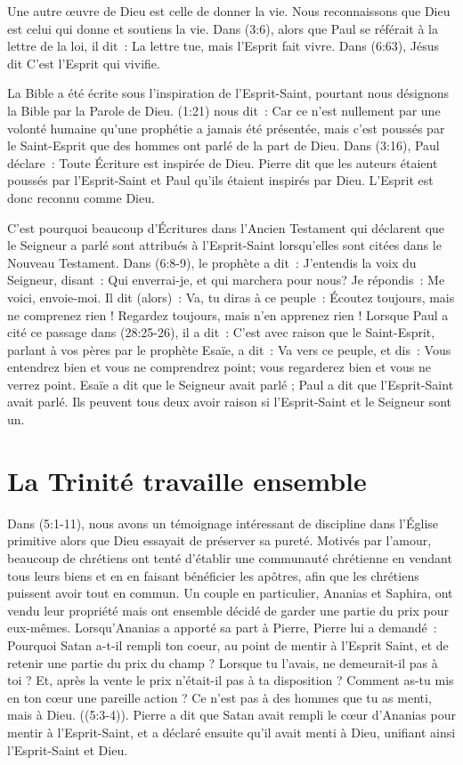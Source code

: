 Une autre œuvre de Dieu est celle de donner la vie. Nous reconnaissons que Dieu est celui qui donne et soutiens la vie. Dans (3:6), alors que Paul se référait à la lettre de la loi, il dit~: \og La lettre tue, mais l'Esprit fait vivre. \fg{} Dans (6:63), Jésus dit \og C'est l'Esprit qui vivifie.\fg{}

La Bible a été écrite sous l'inspiration de l'Esprit-Saint, pourtant nous désignons la Bible par la Parole de Dieu. (1:21) nous dit~: \og Car ce n'est nullement par une volonté humaine qu'une prophétie a jamais été présentée, mais c'est poussés par le Saint-Esprit que des hommes ont parlé de la part de Dieu. \fg{} Dans (3:16), Paul déclare~: \og Toute Écriture est inspirée de Dieu. \fg{} Pierre dit que les auteurs étaient poussés par l'Esprit-Saint et Paul qu'ils étaient inspirés par Dieu. L'Esprit est donc reconnu comme Dieu.

C'est pourquoi beaucoup d'Écritures dans l'Ancien Testament qui déclarent que le Seigneur a parlé sont attribués à l'Esprit-Saint lorsqu'elles sont citées dans le Nouveau Testament. Dans (6:8-9), le prophète a dit~: \og J'entendis la voix du Seigneur, disant~: Qui enverrai-je, et qui marchera pour nous? Je répondis~: Me voici, envoie-moi. Il dit (alors)~: Va, tu diras à ce peuple~: Écoutez toujours, mais ne comprenez rien ! Regardez toujours, mais n'en apprenez rien ! \fg{} Lorsque Paul a cité ce passage dans (28:25-26), il a dit~: \og C'est avec raison que le Saint-Esprit, parlant à vos pères par le prophète Esaïe, a dit~: Va vers ce peuple, et dis~: Vous entendrez bien et vous ne comprendrez point; vous regarderez bien et vous ne verrez point. \fg{} Esaïe a dit que le Seigneur avait parlé ; Paul a dit que l'Esprit-Saint avait parlé. Ils peuvent tous deux avoir raison si l'Esprit-Saint et le Seigneur sont un.


\section*{La Trinité travaille ensemble}

Dans (5:1-11), nous avons un témoignage intéressant de discipline dans l'Église primitive alors que Dieu essayait de préserver sa pureté. Motivés par l'amour, beaucoup de chrétiens ont tenté d'établir une communauté chrétienne en vendant tous leurs biens et en en faisant bénéficier les apôtres, afin que les chrétiens puissent avoir tout en commun. Un couple en particulier, Ananias et Saphira, ont vendu leur propriété mais ont ensemble décidé de garder une partie du prix pour eux-mêmes. Lorsqu'Ananias a apporté sa part à Pierre, Pierre lui a demandé~: \og Pourquoi Satan a-t-il rempli ton coeur, au point de mentir à l'Esprit Saint, et de retenir une partie du prix du champ ? Lorsque tu l'avais, ne demeurait-il pas à toi ? Et, après la vente le prix n'était-il pas à ta disposition ? Comment as-tu mis en ton cœur une pareille action ? Ce n'est pas à des hommes que tu as menti, mais à Dieu.  \fg{} ((5:3-4)). Pierre a dit que Satan avait rempli le cœur d'Ananias pour mentir à l'Esprit-Saint, et a déclaré ensuite qu'il avait menti à Dieu, unifiant ainsi l'Esprit-Saint et Dieu.


